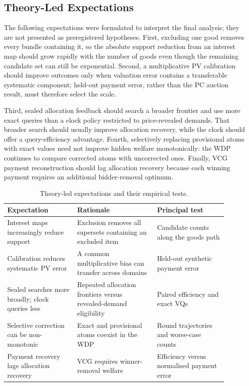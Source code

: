 \subsection{Theory-Led Expectations}

The following expectations were formulated to interpret the final analysis;
they are not presented as preregistered hypotheses. First, excluding one good
removes every bundle containing it, so the absolute support reduction from an
interest map should grow rapidly with the number of goods even though the
remaining candidate set can still be exponential. Second, a multiplicative
PV calibration should improve outcomes only when valuation error contains a
transferable systematic component; held-out payment error, rather than the PC
auction result, must therefore select the scale.

Third, sealed allocation feedback should search a broader frontier and use
more exact queries than a clock policy restricted to price-revealed demands.
That broader search should usually improve allocation recovery, while the
clock should offer a query-efficiency advantage. Fourth, selectively replacing
provisional atoms with exact values need not improve hidden welfare
monotonically: the WDP continues to compare corrected atoms with uncorrected
ones. Finally, VCG payment reconstruction should lag allocation recovery
because each winning payment requires an additional bidder-removal optimum.

\begin{table}[htbp]
\centering
\small
\caption{Theory-led expectations and their empirical tests.}
\label{tab:expectations}
\begin{tabular}{@{}p{0.29\linewidth}p{0.32\linewidth}p{0.29\linewidth}@{}}
\toprule
Expectation & Rationale & Principal test \\
\midrule
Interest maps increasingly reduce support & Exclusion removes all supersets containing an excluded item & Candidate counts along the goods path \\
Calibration reduces systematic PV error & A common multiplicative bias can transfer across domains & Held-out synthetic payment error \\
Sealed searches more broadly; clock queries less & Repeated allocation frontiers versus revealed-demand eligibility & Paired efficiency and exact VQs \\
Selective correction can be non-monotonic & Exact and provisional atoms coexist in the WDP & Round trajectories and worse-case counts \\
Payment recovery lags allocation recovery & VCG requires winner-removal welfare & Efficiency versus normalised payment error \\
\bottomrule
\end{tabular}
\end{table}

